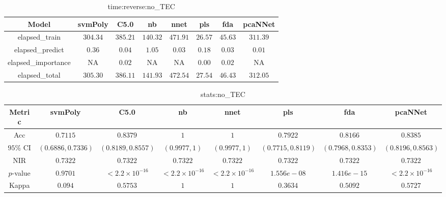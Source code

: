 \begin{table}[!ht]
	\centering
	\begin{tabular}{|c|c|c|c|c|c|c|c|}
		\hline
		Model & svmPoly & C5.0 & nb & nnet & pls & fda & pcaNNet \\ \hline
		elapsed_train & $304.34$ & $385.21$ & $140.32$ & $471.91$ & $26.57$ & $45.63$ & $311.39$ \\ \hline
		elapsed_predict & $0.36$ & $0.04$ & $1.05$ & $0.03$ & $0.18$ & $0.03$ & $0.01$ \\ \hline
		elapsed_importance & NA & $0.02$ & NA & NA & $0.00$ & $0.02$ & NA \\ \hline
		elapsed_total & $305.30$ & $386.11$ & $141.93$ & $472.54$ & $27.54$ & $46.43$ & $312.05$ \\ \hline
	\end{tabular}
	\caption{time:reverse:no_TEC}
	\label{tab:time:reverse:no_TEC}
\end{table}

\begin{table}[!ht]
	\centering
	\begin{tabular}{|c|c|c|c|c|c|c|c|}
		\hline
		Metric & svmPoly & C5.0 & nb & nnet & pls & fda & pcaNNet \\ \hline
		Acc & $0.7115$ & $0.8379$ & $1$ & $1$ & $0.7922$ & $0.8166$ & $0.8385$ \\ \hline
		$95\%$ CI & $(0.6886, 0.7336)$ & $(0.8189, 0.8557)$ & $(0.9977, 1)$ & $(0.9977, 1)$ & $(0.7715, 0.8119)$ & $(0.7968, 0.8353)$ & $(0.8196, 0.8563)$ \\ \hline
		NIR & $0.7322$ & $0.7322$ & $0.7322$ & $0.7322$ & $0.7322$ & $0.7322$ & $0.7322$ \\ \hline
		$p$-value & $0.9701$ & $< 2.2 \times {10}^{-16}$ & $< 2.2 \times {10}^{-16}$ & $< 2.2 \times {10}^{-16}$ & $1.556e-08$ & $1.416e-15$ & $< 2.2 \times {10}^{-16}$ \\ \hline
		Kappa & $0.094$ & $0.5753$ & $1$ & $1$ & $0.3634$ & $0.5092$ & $0.5727$ \\ \hline
	\end{tabular}
	\caption{stats:no_TEC}
	\label{tab:stats:no_TEC}
\end{table}

